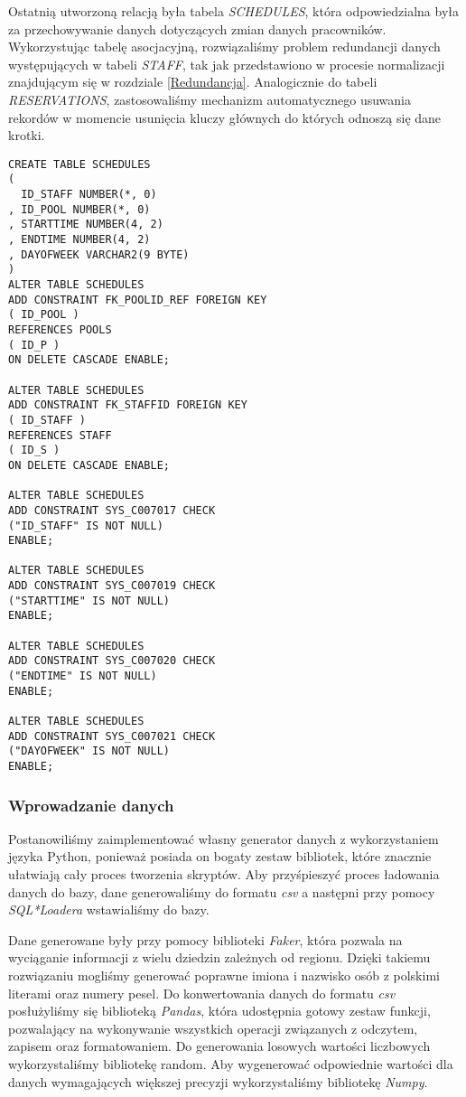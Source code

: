 \documentclass[a4paper]{article}
\begin{document}
\newpage

Ostatnią utworzoną relacją była tabela \textit{SCHEDULES}, która odpowiedzialna była za przechowywanie danych dotyczących zmian danych pracowników. Wykorzystując tabelę asocjacyjną, rozwiązaliśmy problem redundancji danych występujących w tabeli \textit{STAFF}, tak jak przedstawiono w procesie normalizacji znajdującym się w rozdziale \ref{Redundancja}. Analogicznie do tabeli \textit{RESERVATIONS}, zastosowaliśmy mechanizm automatycznego usuwania rekordów w momencie usunięcia kluczy głównych do których odnoszą się dane krotki.

\begin{verbatim}
CREATE TABLE SCHEDULES 
(
  ID_STAFF NUMBER(*, 0) 
, ID_POOL NUMBER(*, 0) 
, STARTTIME NUMBER(4, 2) 
, ENDTIME NUMBER(4, 2) 
, DAYOFWEEK VARCHAR2(9 BYTE) 
)
ALTER TABLE SCHEDULES
ADD CONSTRAINT FK_POOLID_REF FOREIGN KEY
( ID_POOL )
REFERENCES POOLS
( ID_P )
ON DELETE CASCADE ENABLE;

ALTER TABLE SCHEDULES
ADD CONSTRAINT FK_STAFFID FOREIGN KEY
( ID_STAFF )
REFERENCES STAFF
( ID_S )
ON DELETE CASCADE ENABLE;

ALTER TABLE SCHEDULES
ADD CONSTRAINT SYS_C007017 CHECK 
("ID_STAFF" IS NOT NULL)
ENABLE;

ALTER TABLE SCHEDULES
ADD CONSTRAINT SYS_C007019 CHECK 
("STARTTIME" IS NOT NULL)
ENABLE;

ALTER TABLE SCHEDULES
ADD CONSTRAINT SYS_C007020 CHECK 
("ENDTIME" IS NOT NULL)
ENABLE;

ALTER TABLE SCHEDULES
ADD CONSTRAINT SYS_C007021 CHECK 
("DAYOFWEEK" IS NOT NULL)
ENABLE;

\end{verbatim}

\subsubsection{Wprowadzanie danych}

Postanowiliśmy zaimplementować własny generator danych z wykorzystaniem języka Python, ponieważ posiada on bogaty zestaw bibliotek, które znacznie ułatwiają cały proces tworzenia skryptów. Aby przyśpieszyć proces ładowania danych do bazy, dane generowaliśmy do formatu \textit{csv} a następni przy pomocy \textit{SQL*Loadera} wstawialiśmy do bazy.

Dane generowane były przy pomocy biblioteki \textit{Faker}, która pozwala na wyciąganie informacji z wielu dziedzin zależnych od regionu. Dzięki takiemu rozwiązaniu mogliśmy generować poprawne imiona i nazwisko osób z polskimi literami oraz numery pesel. Do konwertowania danych do formatu \textit{csv} posłużyliśmy się biblioteką \textit{Pandas}, która udostępnia gotowy zestaw funkcji, pozwalający na wykonywanie wszystkich operacji związanych z odczytem, zapisem oraz formatowaniem. Do generowania losowych wartości liczbowych wykorzystaliśmy bibliotekę random. Aby wygenerować odpowiednie wartości dla danych wymagających większej precyzji wykorzystaliśmy bibliotekę \textit{Numpy}.
\end{document}

